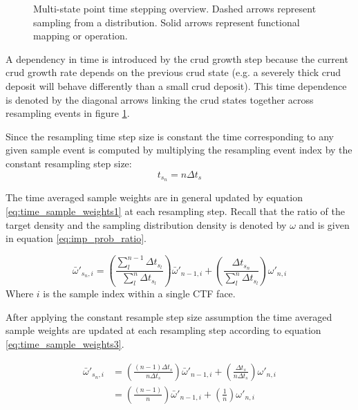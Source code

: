 \begin{figure}
\caption{Multi-state point time stepping overview. Dashed arrows represent sampling from a distribution.  Solid arrows represent functional mapping or operation.}
\label{fig:stepscheme}
\end{figure}

A dependency in time is introduced by the crud growth step because the current crud growth rate depends on the previous crud state (e.g. a severely thick crud deposit will behave differently than a small crud deposit).  This time dependence is denoted by the diagonal arrows linking the crud states together across resampling events in figure \ref{fig:stepscheme}.

Since the resampling time step size is constant the time corresponding to any given sample event is computed by multiplying the resampling event index by the constant resampling step size:
\begin{equation}
t_{s_n} = n\Delta t_s
\end{equation}

The time averaged sample weights are in general updated by equation \ref{eq:time_sample_weights1} at each resampling step.
Recall that the ratio of the target density and the sampling distribution density is denoted by $\omega$ and is given in equation \ref{eq:imp_prob_ratio}.

\begin{equation}
\bar \omega'_{{s_n},i} =
\left( \frac{\sum_{l}^{n-1} \Delta t_{s_l}}{\sum_l^n \Delta t_{s_l}} \right) \bar \omega'_{n-1,i} +
\left( \frac{\Delta t_{s_n}}{\sum_l^n \Delta t_{s_l}} \right) \omega'_{n,i}
\label{eq:time_sample_weights1}
\end{equation}
Where $i$ is the sample index within a single CTF face.

After applying the constant resample step size assumption the time averaged sample weights are updated at each resampling step according to equation \ref{eq:time_sample_weights3}.

\begin{align}
\bar \omega'_{{s_n},i} &= \left( \frac{(n-1) \Delta t_s}{n \Delta t_s} \right) \bar \omega'_{n-1,i} + \left( \frac{\Delta t_s}{n \Delta t_s} \right) \omega'_{n,i} \nonumber \\
 &= \left( \frac{(n-1)}{n} \right) \bar \omega'_{n-1,i} + \left( \frac{1}{n} \right) \omega'_{n,i}
\label{eq:time_sample_weights3}
\end{align}

